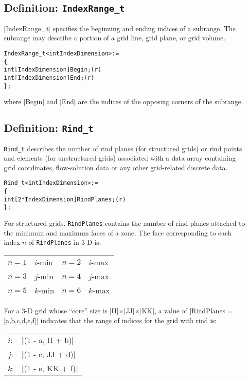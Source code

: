 \subsection{Definition: \texttt{IndexRange\_t}}
\label{s:IndexRange}

|IndexRange_t| specifies the beginning and ending indices of a subrange.
The subrange may describe a portion of a grid line, grid plane, or grid
volume.
\begin{alltt}
  IndexRange\_t< int IndexDimension > :=
    \{
    int[IndexDimension] Begin ;                                             (r)
    int[IndexDimension] End ;                                               (r)
    \} ;
\end{alltt}
where |Begin| and |End| are the indices of the opposing corners of the
subrange.

\subsection{Definition: \texttt{Rind\_t}} 
\label{s:Rind}

\texttt{Rind\_t} describes the number of rind planes (for structured
grids) or rind points and elements (for unstructured grids) associated
with a data array containing grid coordinates, flow-solution data or any
other grid-related discrete data.
\begin{alltt}
  Rind\_t< int IndexDimension > :=
    \{
    int[2*IndexDimension] RindPlanes ;                                      (r)
    \} ;
\end{alltt}
For structured grids, \texttt{RindPlanes} contains the number of rind
planes attached to the minimum and maximum faces of a zone.
The face corresponding to each index $n$ of \texttt{RindPlanes} in 3-D is:
\begin{center}
\begin{tabular}{r@{\ $\rightarrow$ \ }l@{\qquad\qquad}r@{\ $\rightarrow$ \ }l}
  $n = 1$ & $i$-min  &  $n = 2$ & $i$-max \\
  $n = 3$ & $j$-min  &  $n = 4$ & $j$-max \\
  $n = 5$ & $k$-min  &  $n = 6$ & $k$-max
\end{tabular}
\end{center}

For a 3-D grid whose ``core'' size is |II|$\times$|JJ|$\times$|KK|, a value of 
|RindPlanes = [a,b,c,d,e,f]| indicates that the range of indices for the grid 
with rind is:
\begin{center}
\begin{tabular}{ll}
  $i$: & |(1 - a, II + b)| \\
  $j$: & |(1 - c, JJ + d)| \\
  $k$: & |(1 - e, KK + f)|
\end{tabular}
\end{center}

